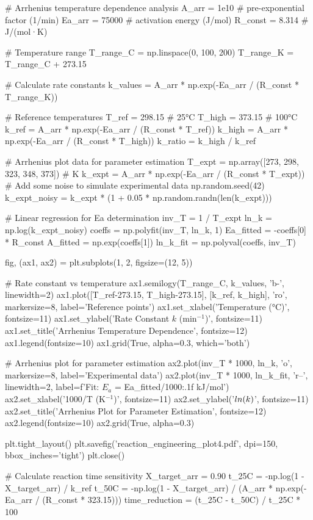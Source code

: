 \documentclass[11pt,a4paper]{article}
\begin{document}
\begin{pycode}
# Arrhenius temperature dependence analysis
A_arr = 1e10  # pre-exponential factor (1/min)
Ea_arr = 75000  # activation energy (J/mol)
R_const = 8.314  # J/(mol·K)

# Temperature range
T_range_C = np.linspace(0, 100, 200)
T_range_K = T_range_C + 273.15

# Calculate rate constants
k_values = A_arr * np.exp(-Ea_arr / (R_const * T_range_K))

# Reference temperatures
T_ref = 298.15  # 25°C
T_high = 373.15  # 100°C
k_ref = A_arr * np.exp(-Ea_arr / (R_const * T_ref))
k_high = A_arr * np.exp(-Ea_arr / (R_const * T_high))
k_ratio = k_high / k_ref

# Arrhenius plot data for parameter estimation
T_expt = np.array([273, 298, 323, 348, 373])  # K
k_expt = A_arr * np.exp(-Ea_arr / (R_const * T_expt))
# Add some noise to simulate experimental data
np.random.seed(42)
k_expt_noisy = k_expt * (1 + 0.05 * np.random.randn(len(k_expt)))

# Linear regression for Ea determination
inv_T = 1 / T_expt
ln_k = np.log(k_expt_noisy)
coeffs = np.polyfit(inv_T, ln_k, 1)
Ea_fitted = -coeffs[0] * R_const
A_fitted = np.exp(coeffs[1])
ln_k_fit = np.polyval(coeffs, inv_T)

fig, (ax1, ax2) = plt.subplots(1, 2, figsize=(12, 5))

# Rate constant vs temperature
ax1.semilogy(T_range_C, k_values, 'b-', linewidth=2)
ax1.plot([T_ref-273.15, T_high-273.15], [k_ref, k_high], 'ro', markersize=8, label='Reference points')
ax1.set_xlabel('Temperature (°C)', fontsize=11)
ax1.set_ylabel('Rate Constant $k$ (min$^{-1}$)', fontsize=11)
ax1.set_title('Arrhenius Temperature Dependence', fontsize=12)
ax1.legend(fontsize=10)
ax1.grid(True, alpha=0.3, which='both')

# Arrhenius plot for parameter estimation
ax2.plot(inv_T * 1000, ln_k, 'o', markersize=8, label='Experimental data')
ax2.plot(inv_T * 1000, ln_k_fit, 'r--', linewidth=2, label=f'Fit: $E_a$ = {Ea_fitted/1000:.1f} kJ/mol')
ax2.set_xlabel('1000/T (K$^{-1}$)', fontsize=11)
ax2.set_ylabel('$\\ln(k)$', fontsize=11)
ax2.set_title('Arrhenius Plot for Parameter Estimation', fontsize=12)
ax2.legend(fontsize=10)
ax2.grid(True, alpha=0.3)

plt.tight_layout()
plt.savefig('reaction_engineering_plot4.pdf', dpi=150, bbox_inches='tight')
plt.close()

# Calculate reaction time sensitivity
X_target_arr = 0.90
t_25C = -np.log(1 - X_target_arr) / k_ref
t_50C = -np.log(1 - X_target_arr) / (A_arr * np.exp(-Ea_arr / (R_const * 323.15)))
time_reduction = (t_25C - t_50C) / t_25C * 100
\end{pycode}
\end{document}
